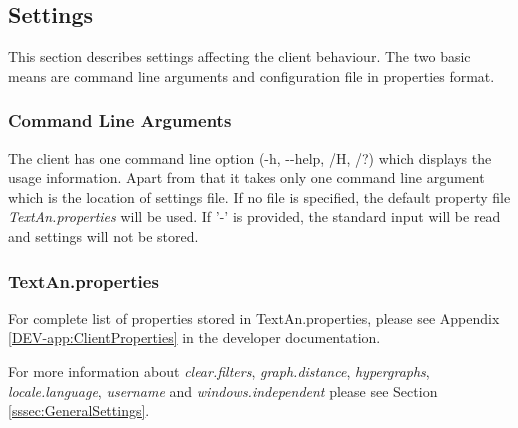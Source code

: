 \subsection{Settings}
\label{ssec:ClientSettings}

This section describes settings affecting the client behaviour. The two basic
means are command line arguments and configuration file in properties format.

\subsubsection{Command Line Arguments}
\label{ssec:CliCmdArg}

The client has one command line option (-h, -{}-help, /H, /?) which displays the
usage information. Apart from that it takes only one command line argument
which is the location of settings file. If no file is specified, the default
property file \emph{TextAn.properties} will be used. If '-' is provided, the
standard input will be read and settings will not be stored.

\subsubsection{TextAn.properties}

For complete list of properties stored in TextAn.properties, please see  Appendix \ref{DEV-app:ClientProperties} in the developer documentation.

For more information about \emph{clear.filters}, \emph{graph.distance},
\emph{hypergraphs}, \emph{locale.language}, \emph{username}
and \emph{windows.independent} please see Section \ref{sssec:GeneralSettings}.
